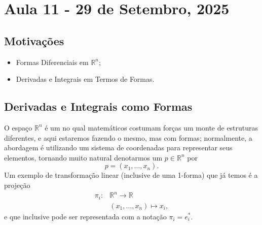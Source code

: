 \documentclass[../differential_forms.tex]{subfiles}
\begin{document}
\section{Aula 11 - 29 de Setembro, 2025}
\subsection{Motivações}
\begin{itemize}
	\item Formas Diferenciais em \(\mathbb{R}^{n}\);
	\item Derivadas e Integrais em Termos de Formas.
\end{itemize}
\subsection{Derivadas e Integrais como Formas}
O espaço \(\mathbb{R}^{n}\) é um no qual matemáticos costumam forças um monte de estruturas diferentes, e aqui estaremos fazendo o mesmo,
mas com formas; normalmente, a abordagem é utilizando um sistema de coordenadas para representar seus elementos, tornando muito natural
denotarmos um \(p\in \mathbb{R}^{n}\) por
\[
	p = (x_1, \dotsc , x_{n}).
\]
Um exemplo de transformação linear (inclusive de uma 1-forma) que já temos é a projeção
\begin{align*}
	\pi_{i}: & \mathbb{R}^{n}\rightarrow\mathbb{R}     \\
	         & (x_1, \dotsc , x_{n})\longmapsto x_{i},
\end{align*}
e que inclusive pode ser representada com a notação \(\pi_{i} = e_{i}^{*}\).
\end{document}
